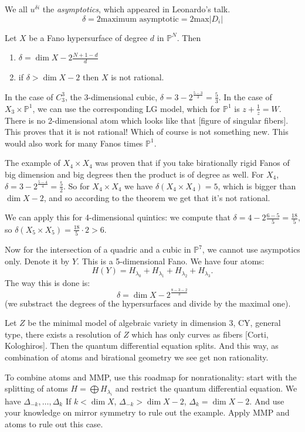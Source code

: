 We all $u^{\delta i }$ the 
{\it asymptotics},
which appeared in Leonardo's talk.
$$
\delta = 2 \text{maximum asymptotic}
=2 \text{max} |D_i|
$$
\begin{theorem}
\label{theorem-asymtptics-lud2}
Let $X$ be a 
Fano hypersurface 
of degree $d$ in $\mathbb{P}^N$.
Then
\begin{enumerate}
\item $\delta = \dim X - 2 \frac{N+1-d}{d}$
\item  if $\delta> \dim X -2$ then
$X$ is not rational. 
\end{enumerate}
\end{theorem}

\noindent
In the case of $C^3_3$, the 3-dimensional
cubic, $\delta = 3-2^{\frac{5-3}{3}}=
\frac{5}{3}$. In the case of
$X_3 \times \mathbb{P}^1$,
we can use the corresponding LG model,
which for $\mathbb{P}^1$ is
$z+\frac{1}{z}=W$.
There is no 2-dimensional atom which looks
like that [figure of singular fibers].
This proves that it is not rational!
Which of course is not something new.
This would also work for many Fanos times
$\mathbb{P}^1$.

The example of $X_4 \times X_4$
was proven that if you take birationally
rigid Fanos of big dimension and big degrees
then the product is of degree as well.
For $X_4$, $\delta=3-2^{\frac{5-4}{4}}
=\frac{5}{2}$. So for $X_4 \times X_4$
we have $\delta(X_4\times X_4)=5$, 
which is bigger than $\dim X-2$, and
so according to the theorem
we get that it's not rational.

We can apply this for 4-dimensional quintics:
we compute that $\delta=4-2 \frac{6-5}{5}
=\frac{18}{5}$, so
$\delta(X_5\times X_5)=\frac{18}{5}\cdot 2
> 6$.

Now for the intersection of a quadric
and a cubic in $\mathbb{P}^7$,
we cannot use asympotics only.
Denote it by $Y$.
This is a 5-dimensional Fano.
We have four atoms:
$$
H(Y)=H_{\lambda_0} + H_{\lambda_1}
+H_{\lambda_2}+H_{\lambda_3}.
$$
The way this is done is:
$$
\delta= \dim X -2^{\frac{8-3-2}{3}} 
$$
(we substract the degrees of the
hypersurfaces
and divide by the maximal one).

\medskip\noindent
Let $Z$ be the 
minimal model of algebraic variety in
dimension 3, CY, general type, 
there exists a resolution of $Z$
which has only curves as fibers
[Corti, Kologhiros].
Then the quantum differential equation 
splits. And this way, as combination
of atoms and birational geometry
we see get non rationality.

\medskip\noindent
To combine atoms and MMP, use this roadmap
for nonrationality:
start with the splitting of atoms
$H = \bigoplus H_{\lambda_i}$
and restrict the quantum differential
equation. We have $\Delta_{-k}, …,\Delta_k$
If $k< \dim X$,
$\Delta_{-k}>\dim X -2$,
$\Delta_k = \dim X -2$.
And use your knowledge on mirror symmetry
to rule out the example.
Apply MMP and atoms to rule out this case.

